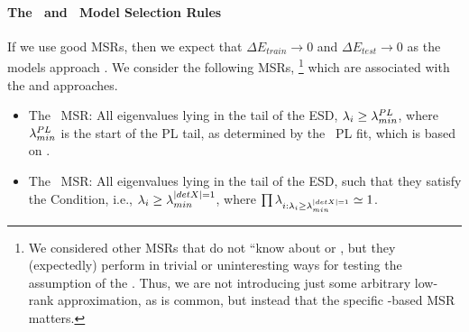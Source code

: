 \paragraph{The \POWERLAW~and \TRACELOG~Model Selection Rules}
If we use good MSRs, then we expect that $\Delta E_{train}\to 0$ and $\Delta E_{test}\to 0$ as the models approach \IdealLearning. 
%
We consider the following MSRs,%
\footnote{We considered other MSRs that do not ``know about \HTSR or \SETOL, but they (expectedly) perform in trivial or uninteresting ways for testing the assumption of the \EffectiveCorrelationSpace.  Thus, we are not introducing just some arbitrary low-rank approximation, as is common, but instead that the specific \SETOL-based MSR matters.} 
which are associated with the \HTSR and \SETOL approaches.
\begin{itemize}
\item 
The \POWERLAW~MSR: 
All eigenvalues lying in the tail of the ESD, 
$\lambda_i \ge \lambda^{PL}_{min}$, where $\lambda^{PL}_{min}$ is the start of the PL tail, as determined by the \WW~PL fit, which is based on \cite{CSN09_powerlaw}.
\item 
The \TRACELOG~MSR: 
All eigenvalues lying in the tail of the ESD, 
such that they satisfy the \TRACELOG  Condition, i.e., $\lambda_{i}\ge \lambda^{\vert detX\vert=1}_{min}$, where $\prod\lambda_{i:\lambda_i \ge \lambda^{\vert detX\vert=1}_{min}}\simeq 1$.
\end{itemize}


%



